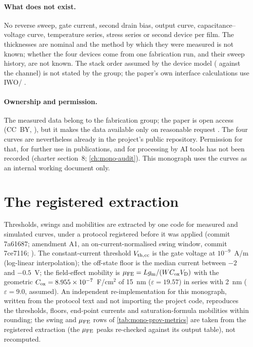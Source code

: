 \paragraph{What does not exist.} No reverse sweep, gate current, second drain bias, output curve, capacitance--voltage
curve, temperature series, stress series or second device per film. The thicknesses are nominal and the method by which
they were measured is not known; whether the four devices come from one fabrication run, and their sweep history, are
not known. The stack order assumed by the device model (\AlO{} against the channel) is not stated by the group; the
paper's own interface calculations use IWO/\HfO{} \citep{Januar2026}.

\paragraph{Ownership and permission.} The measured data belong to the fabrication group; the paper is open access
(CC~BY, \citealp[p.~1]{Januar2026}), but it makes the data available only on reasonable request
\citep[p.~10]{Januar2026}. The four curves are nevertheless already in the
project's public repository. Permission for that, for further use in publications, and for processing by AI tools has
not been recorded (charter section~8; \cref{ch:mono-audit}). This monograph uses the curves as an internal working
document only.

\section{The registered extraction}
\label{sec:mono-prov-extraction}

Thresholds, swings and mobilities are extracted by one code for measured and simulated curves, under a protocol
registered before it was applied (commit 7a61687; amendment A1, an on-current-normalised swing window, commit 7ce7116;
). The constant-current threshold $V_{\mathrm{th,cc}}$ is the gate voltage at $10^{-9}$~A/\textmu m (log-linear
interpolation); the off-state floor is the median current between $-2$ and $-0.5$~V; the field-effect mobility is
$\mu_{\mathrm{FE}} = Lg_{\mathrm{m}}/(WC_{\mathrm{ox}}V_{\mathrm{D}})$ with the geometric $C_{\mathrm{ox}} = 8.955\times10^{-7}$~F/cm$^2$ of 15~nm \HfO{} ($\varepsilon = 19.57$)
in series with 2~nm \AlO{} ($\varepsilon = 9.0$, assumed). An independent re-implementation for this monograph, written
from the protocol text and not importing the project code, reproduces the thresholds, floors, end-point currents and
saturation-formula mobilities within rounding; the swing and $\mu_{\mathrm{FE}}$ rows of \cref{tab:mono-prov-metrics} are taken
from the registered extraction (the $\mu_{\mathrm{FE}}$ peaks re-checked against its output table), not recomputed.

